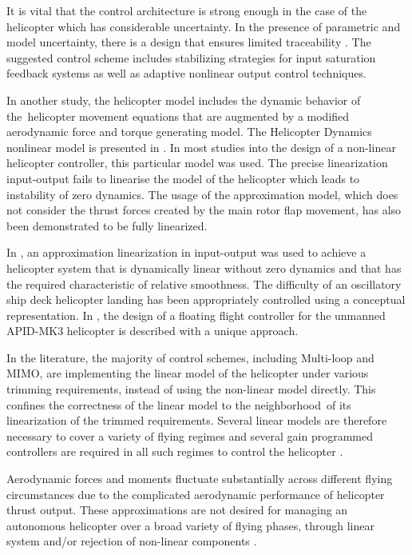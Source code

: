 It is vital that the control architecture is strong enough in the case of the helicopter which has considerable uncertainty. In the presence of parametric and model uncertainty, there is a design that ensures limited traceability \cite{isidori2003robust}. The suggested control scheme includes stabilizing strategies for input saturation feedback systems as well as adaptive nonlinear output control techniques.

In another study, the helicopter model includes the dynamic behavior of the helicopter movement equations that are augmented by a modified aerodynamic force and torque generating model. The Helicopter Dynamics nonlinear model is presented in \cite{koo1999differential}. In most studies into the design of a non-linear helicopter controller, this particular model was used. The precise linearization input-output fails to linearise the model of the helicopter which leads to instability of zero dynamics. The usage of the approximation model, which does not consider the thrust forces created by the main rotor flap movement, has also been demonstrated to be fully linearized.


In \cite{koo1998output}, an approximation linearization in input-output was used to achieve a helicopter system that is dynamically linear without zero dynamics and that has the required characteristic of relative smoothness. The difficulty of an oscillatory ship deck helicopter landing \cite{isidori2012robust} has been appropriately controlled using a conceptual representation. In \cite{kadmiry2004fuzzy}, the design of a floating flight controller for the unmanned APID-MK3 helicopter is described with a unique approach. 


In the literature, the majority of control schemes, including Multi-loop and MIMO, are implementing the linear model of the helicopter under various trimming requirements, instead of using the non-linear model directly. This confines the correctness of the linear model to the neighborhood of its linearization of the trimmed requirements. Several linear models are therefore necessary to cover a variety of flying regimes and several gain programmed controllers are required in all such regimes to control the helicopter \cite{downs2007control}. 

Aerodynamic forces and moments fluctuate substantially across different flying circumstances due to the complicated aerodynamic performance of helicopter thrust output. These approximations are not desired for managing an autonomous helicopter over a broad variety of flying phases, through linear system and/or rejection of non-linear components \cite{raptis2011linear}. 


